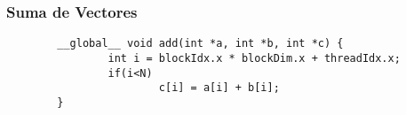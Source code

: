 \begin{frame}[fragile]
	\frametitle{Suma de Vectores}
	\begin{lstlisting}
		__global__ void add(int *a, int *b, int *c) {
		        int i = blockIdx.x * blockDim.x + threadIdx.x;
        		if(i<N)
                		c[i] = a[i] + b[i];
		}
	\end{lstlisting}
\end{frame}
